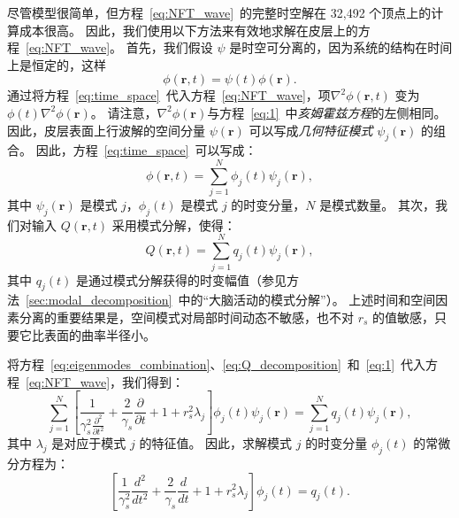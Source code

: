 \documentclass[lang=cn,a4paper,newtx,citestyle=gb7714-2015, bibstyle=gb7714-2015]{elegantpaper}
\begin{document}
尽管模型很简单，但方程~\ref{eq:NFT_wave}~的完整时空解在 32,492 个顶点上的计算成本很高。
因此，我们使用以下方法来有效地求解在皮层上的方程~\ref{eq:NFT_wave}。
首先，我们假设 $ \psi $ 是时空可分离的，因为系统的结构在时间上是恒定的，这样
%
\begin{equation}\label{eq:time_space}
	\phi(\boldsymbol{r}, t) = 
		\psi(t) \phi(\boldsymbol{r}).
\end{equation}
%
通过将方程~\ref{eq:time_space}~代入方程~\ref{eq:NFT_wave}，项$ \nabla^2 \phi(\boldsymbol{r}, t) $ 变为 $ \phi(t) \nabla^2 \phi
(\boldsymbol{r}) $。
请注意，$ \nabla^2 \phi(\boldsymbol{r}) $与方程~\ref{eq:1}~中\textit{亥姆霍兹方程}的左侧相同。
因此，皮层表面上行波解的空间分量 $ \psi(\boldsymbol{r}) $ 可以写成\textit{几何特征模式} $ \psi_j(\boldsymbol{r}) $ 的组合。
因此，方程~\ref{eq:time_space}~可以写成：
%
\begin{equation}\label{eq:eigenmodes_combination}
	\phi(\boldsymbol{r}, t) = 
		\sum_{j=1}^{N}
			\phi_j(t) \psi_j(\boldsymbol{r}),
\end{equation}
%
其中 $ \psi_j(\boldsymbol{r}) $ 是模式 $ j $，$ \phi_j(t) $ 是模式 $ j $ 的时变分量，$ N $ 是模式数量。
其次，我们对输入 $ Q(\boldsymbol{r},t) $ 采用模式分解，使得：
%
\begin{equation}\label{eq:Q_decomposition}
	Q(\boldsymbol{r}, t) = 
		\sum_{j=1}^{N}
			q_j(t) \psi_j(\boldsymbol{r}),
\end{equation}
%
其中 $ q_j (t) $ 是通过模式分解获得的时变幅值（参见方法~\ref{sec:modal_decomposition}~中的“大脑活动的模式分解”）。
上述时间和空间因素分离的重要结果是，空间模式对局部时间动态不敏感，也不对 $ r_s $ 的值敏感，只要它比表面的曲率半径小。


将方程~\ref{eq:eigenmodes_combination}、\ref{eq:Q_decomposition}~和~\ref{eq:1}~代入方程~\ref{eq:NFT_wave}，我们得到：
%
\begin{equation}\label{eq:NFT_expand}
	\sum_{j=1}^{N}
		[
		\frac{1}{\gamma _s^2 \frac{\partial^2}{\partial t^2}} +
		\frac{2}{\gamma _s} \frac{\partial}{\partial t} +
		1 + r_s^2 \lambda_j
		]
		\phi_j(t)
		\psi_j(\boldsymbol{r})
	=
		\sum_{j=1}^{N}
			q_j(t)
			\psi_j(\boldsymbol{r}),
\end{equation}
%
其中 $ λ_j $ 是对应于模式 $ j $ 的特征值。
因此，求解模式 $ j $ 的时变分量 $ \phi_j (t) $ 的常微分方程为：
%
\begin{equation}\label{eq:ordinary_differential}
	[
		\frac{1}{\gamma _s^2}
		\frac{d^2}{dt^2}
		+
		\frac{2}{\gamma _s}
		\frac{d}{dt}
		+ 1 + r_s^2 \lambda_j
	]
	\phi_j(t) 
	=
	q_j(t).
\end{equation}
\end{document}
